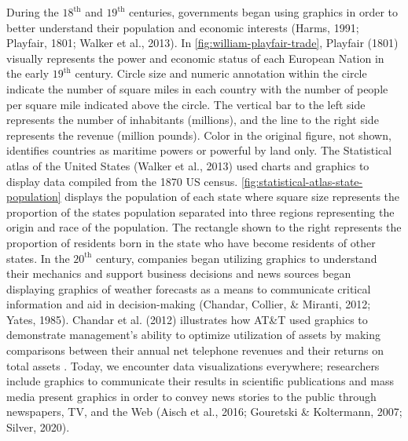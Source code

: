 \documentclass[print]{nuthesis}
\begin{document}
During the \(\text{18}^{\text{th}}\) and \(\text{19}^{\text{th}}\) centuries, governments began using graphics in order to better understand their population and economic interests (Harms, 1991; Playfair, 1801; Walker et al., 2013).
In \cref{fig:william-playfair-trade}, Playfair (1801) visually represents the power and economic status of each European Nation in the early \(\text{19}^{\text{th}}\) century.
Circle size and numeric annotation within the circle indicate the number of square miles in each country with the number of people per square mile indicated above the circle.
The vertical bar to the left side represents the number of inhabitants (millions), and the line to the right side represents the revenue (million pounds).
Color in the original figure, not shown, identifies countries as maritime powers or powerful by land only.
The Statistical atlas of the United States (Walker et al., 2013) used charts and graphics to display data compiled from the 1870 US census.
\cref{fig:statistical-atlas-state-population} displays the population of each state where square size represents the proportion of the states population separated into three regions representing the origin and race of the population.
The rectangle shown to the right represents the proportion of residents born in the state who have become residents of other states.
In the \(\text{20}^{\text{th}}\) century, companies began utilizing graphics to understand their mechanics and support business decisions and news sources began displaying graphics of weather forecasts as a means to communicate critical information and aid in decision-making (Chandar, Collier, \& Miranti, 2012; Yates, 1985).
Chandar et al. (2012) illustrates how AT\&T used graphics to demonstrate management's ability to optimize utilization of assets by making comparisons between their annual net telephone revenues and their returns on total assets .
Today, we encounter data visualizations everywhere; researchers include graphics to communicate their results in scientific publications and mass media present graphics in order to convey news stories to the public through newspapers, TV, and the Web (Aisch et al., 2016; Gouretski \& Koltermann, 2007; Silver, 2020).
\end{document}
